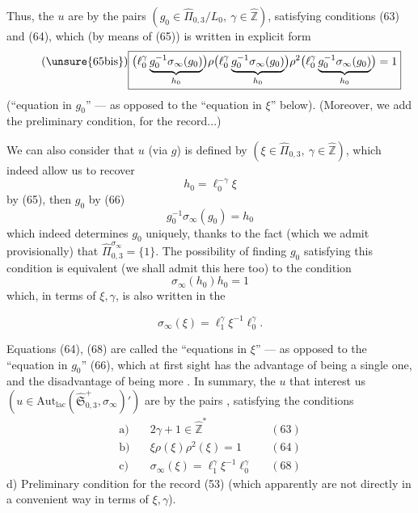 
Thus, the $u$ are  by the pairs
$(g_0\in\widehat{\Pi}_{0,3}/L_0,\ \gamma\in\widehat{\mathbb Z})$, satisfying conditions
(63) and (64), which (by means of (65)) is written in explicit form
\[
\tag{\unsure{65bis}}
\boxed{
\bigl(\ell_0^\gamma\underbrace{g_0^{-1}\sigma_\infty(g_0)}_{h_0}\bigr)
\rho\bigl(\ell_0^\gamma\underbrace{g_0^{-1}\sigma_\infty(g_0)}_{h_0}\bigr)
\rho^2\bigl(\ell_0^\gamma\underbrace{g_0^{-1}\sigma_\infty(g_0)}_{h_0}\bigr)=1
}
\]
(``equation in $g_0$'' --- as opposed to the ``equation in $\xi$'' below).
(Moreover, we  add the preliminary condition, for the record...)

We can also consider that  $u$ (via $g$) is defined by
$(\xi\in\widehat{\Pi}_{0,3},\ \gamma\in\widehat{\mathbb Z})$, which indeed allow us to recover
\[
h_0=\ell_0^{-\gamma}\xi
\]
by (65), then $g_0$ by (66)
\[
g_0^{-1}\sigma_\infty(g_0)=h_0
\]
which indeed determines $g_0$ uniquely, thanks to the fact (which we admit provisionally)
that $\widehat{\Pi}_{0,3}^{\sigma_\infty}=\{1\}$.
The possibility of finding $g_0$ satisfying this condition is equivalent (we shall admit this here too) to the condition
\[
\tag{67}
\sigma_\infty(h_0)h_0=1
\]
which, in terms of $\xi,\gamma$, is also written in the 


\[
\tag{68}
\boxed{\sigma_\infty(\xi)=\ell_1^\gamma\xi^{-1}\ell_0^\gamma}.
\]

Equations (64), (68) are called the ``equations in $\xi$'' --- as opposed to the ``equation in $g_0$'' (66), which at first sight has the advantage of being a single one, and the disadvantage of being more .
In summary, the $u$ that interest us
$(u\in\mathrm{Aut}_{\mathrm{lac}}(\widehat{\mathfrak S}_{0,3}^{+},\sigma_\infty)')$
are  by the pairs
\deleted{$\unsure{(\xi,\gamma)}$}, satisfying the conditions
\[
\begin{aligned}
\text{a)}\quad&2\gamma+1\in\widehat{\mathbb Z}^{*} &&(63)\\
\text{b)}\quad&\xi\rho(\xi)\rho^2(\xi)=1 &&(64)\\
\text{c)}\quad&\sigma_\infty(\xi)=\ell_1^\gamma\xi^{-1}\ell_0^\gamma &&(68)
\end{aligned}
\]
d) Preliminary condition for the record (53)
(which apparently are not  directly in a convenient way in terms of $\xi,\gamma$).

